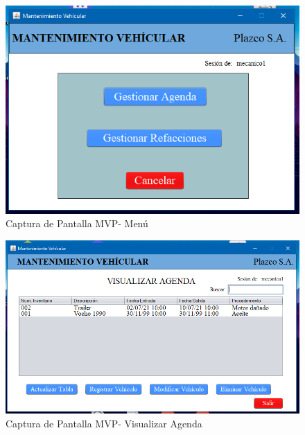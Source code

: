 \begin{figure}
	\centering
	\includegraphics[width=1\textwidth]{./apendice/imagenes/menu}
	\caption{Captura de Pantalla MVP- Menú}
	\label{fig:Captura de Pantalla MVP- Menu}
\end{figure}

\begin{figure}
	\centering
	\includegraphics[width=1\textwidth]{./apendice/imagenes/agenda}
	\caption{Captura de Pantalla MVP- Visualizar Agenda}
	\label{fig:Captura de Pantalla MVP- Visualizar Agenda}
	\end{figure}

